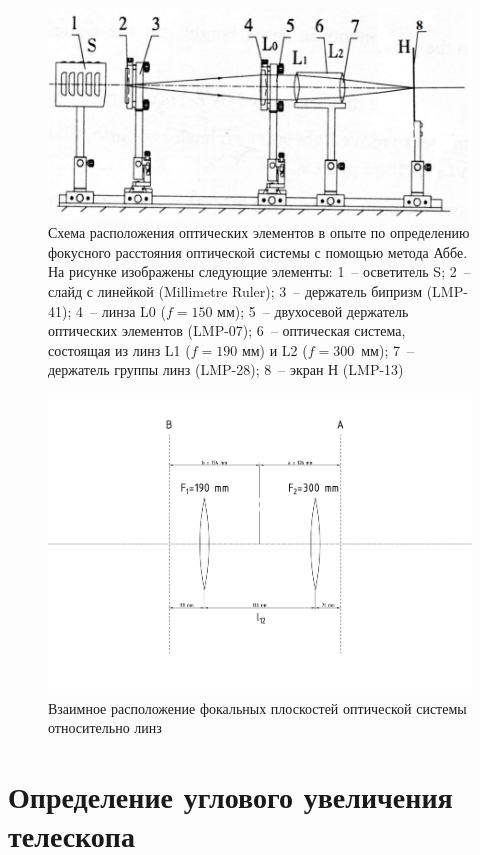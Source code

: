 \documentclass[a4paper, 12pt]{article}
\begin{document}
\begin{figure}[H]
	\centering
	\includegraphics[width=0.7\linewidth]{scheme_4}
	\caption{Схема расположения оптических элементов в опыте по определению фокусного расстояния оптической системы с помощью метода Аббе. На рисунке изображены следующие элементы: 1~-- осветитель S; 2~-- слайд с линейкой (Millimetre Ruler); 3~-- держатель бипризм (LMP-41); 4~-- линза L0 ($f=150$ мм); 5~-- двухосевой держатель оптических элементов (LMP-07); 6~-- оптическая система, состоящая из линз L1 ($f=190$ мм) и L2 ($f=300$~мм); 7~-- держатель группы линз (LMP-28); 8~-- экран Н (LMP-13)}
	\label{fig:3_1}
\end{figure}

\begin{figure}[H]
	\centering
	\includegraphics[width=\linewidth]{lenses}
	\caption{Взаимное расположение фокальных плоскостей оптической системы относительно линз}
	\label{fig:3_2}
\end{figure}


\section{Определение углового увеличения телескопа}
\end{document}
